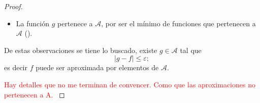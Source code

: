 \begin{proof}
\begin{itemize}
         \item La función $g$ pertenece a $\mathcal{A}$, por ser el mínimo de funciones que pertenecen a $\mathcal{A}$ ().
    \end{itemize}
    De estas observaciones se tiene lo buscado, 
    existe $g \in \mathcal{A}$ tal que 
    \begin{equation}
        |g-f| \leq \varepsilon;
    \end{equation}
    es decir $f$ puede ser aproximada por elementos de $\mathcal{A}$. 

    \textcolor{red}{
        Hay detalles que no me terminan de convencer. 
        Como que las aproximaciones no pertenecen a A.
    }
\end{proof}
